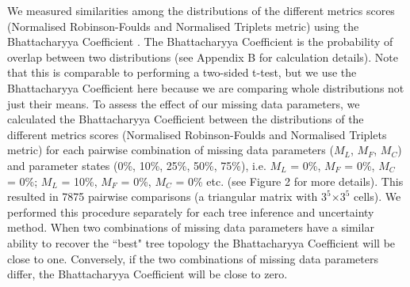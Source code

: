\documentclass[12pt,letterpaper]{article}
\begin{document}
We measured similarities among the distributions of the different metrics scores (Normalised Robinson-Foulds and Normalised Triplets metric) using the Bhattacharyya Coefficient \citep{Bhattacharyya}.
The Bhattacharyya Coefficient is the probability of overlap between two distributions \citep{Bhattacharyya} (see Appendix B for calculation details).
Note that this is comparable to performing a two-sided t-test, but we use the Bhattacharyya Coefficient here because we are comparing whole distributions not just their means.
To assess the effect of our missing data parameters, we calculated the Bhattacharyya Coefficient between the distributions of the different metrics scores (Normalised Robinson-Foulds and Normalised Triplets metric) for each pairwise combination of missing data parameters ($M_{L}$, $M_{F}$, $M_{C}$) and parameter states (0\%, 10\%, 25\%, 50\%, 75\%), i.e. $M_{L}$ = 0\%, $M_{F}$ = 0\%, $M_{C}$ = 0\%; $M_{L}$ = 10\%, $M_{F}$ = 0\%, $M_{C}$ = 0\% etc. (see Figure 2 for more details).
This resulted in 7875 pairwise comparisons (a triangular matrix with $3^5$$\times$$3^5$ cells).
We performed this procedure separately for each tree inference and uncertainty method.
When two combinations of missing data parameters have a similar ability to recover the ``best" tree topology the Bhattacharyya Coefficient will be close to one.
Conversely, if the two combinations of missing data parameters differ, the Bhattacharyya Coefficient will be close to zero.

\end{document}
